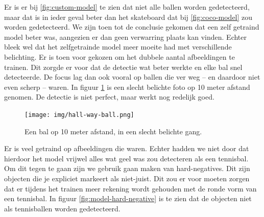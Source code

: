 Er is er bij \ref{fig:custom-model} te zien dat niet alle ballen worden gedetecteerd, maar dat is in ieder geval beter dan het skateboard dat bij \ref{fig:coco-model} zou worden gedetecteerd. We zijn toen tot de conclusie gekomen dat een zelf getraind model beter was, aangezien er dan geen verwarring plaats kan vinden. Echter bleek wel dat het zelfgetrainde model meer moeite had met verschillende belichting. Er is toen voor gekozen om het dubbele aantal afbeeldingen te trainen. Dit zorgde er voor dat de detectie wat beter werkte en elke bal snel detecteerde. De focus lag dan ook vooral op ballen die ver weg -- en daardoor niet even scherp -- waren. In figuur \ref{fig:hall-way-ball} is een slecht belichte foto op 10 meter afstand genomen. De detectie is niet perfect, maar werkt nog redelijk goed. \\

\begin{figure}[H]
    \centering
    \texttt{[image: img/hall-way-ball.png]}
    \caption{Een bal op 10 meter afstand, in een slecht belichte gang.}
    \label{fig:hall-way-ball}
\end{figure}

Er is veel getraind op afbeeldingen die  waren. Echter hadden we niet door dat hierdoor het model vrijwel alles wat geel was zou detecteren als een tennisbal. Om dit tegen te gaan zijn we gebruik gaan maken van hard-negatives. Dit zijn objecten die je expliciet markeert als niet-juist. Dit zou er voor moeten zorgen dat er tijdens het trainen meer rekening wordt gehouden met de ronde vorm van een tennisbal. In figuur \ref{fig:model-hard-negative} is te zien dat de objecten niet als tennisballen worden gedetecteerd.


